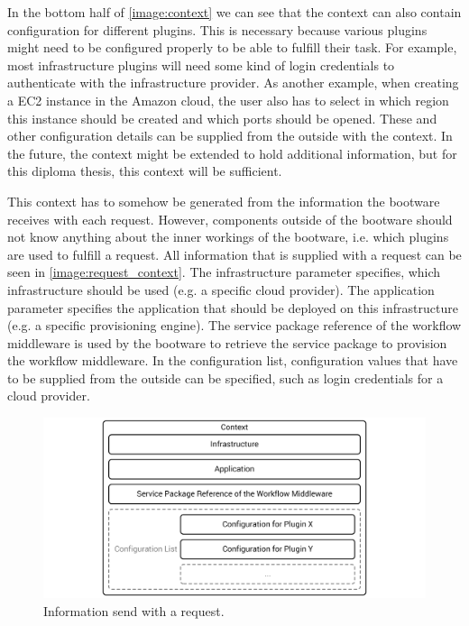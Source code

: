 In the bottom half of \autoref{image:context} we can see that the context can also contain configuration for different plugins.
This is necessary because various plugins might need to be configured properly to be able to fulfill their task.
For example, most infrastructure plugins will need some kind of login credentials to authenticate with the infrastructure provider.
As another example, when creating a EC2 instance in the Amazon cloud, the user also has to select in which region this instance should be created and which ports should be opened.
These and other configuration details can be supplied from the outside with the context.
In the future, the context might be extended to hold additional information, but for this diploma thesis, this context will be sufficient.

This context has to somehow be generated from the information the bootware receives with each request.
However, components outside of the bootware should not know anything about the inner workings of the bootware, i.e. which plugins are used to fulfill a request.
All information that is supplied with a request can be seen in \autoref{image:request_context}.
The infrastructure parameter specifies, which infrastructure should be used (e.g. a specific cloud provider).
The application parameter specifies the application that should be deployed on this infrastructure (e.g. a specific provisioning engine).
The service package reference of the workflow middleware is used by the bootware to retrieve the service package to provision the workflow middleware.
In the configuration list, configuration values that have to be supplied from the outside can be specified, such as login credentials for a cloud provider.

\begin{figure}[!htbp]
	\centering
	\includegraphics[resolution=600]{design/assets/request_context}
	\caption{Information send with a request.}
	\label{image:request_context}
\end{figure}

